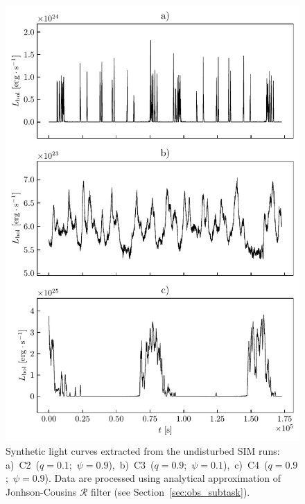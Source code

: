     \begin{figure}
    \begin{center}
        \includegraphics[width=1.0\textwidth]{img/plot_light_curves_undisturbed.pdf}
    \end{center}
        \caption{Synthetic light curves extracted from the undisturbed SIM runs: \mbox{a) C2 ($q = 0.1$; $\psi = 0.9$), b) C3 ($q = 0.9$; $\psi = 0.1$), c) C4 ($q = 0.9$; $\psi = 0.9$)}. Data are processed using analytical approximation of Jonhson-Cousins $\mathcal{R}$ filter (see Section~\ref{sec:obs_subtask}).}
    \label{fig:plot_light_curves_undisturbed}
    \end{figure}
    
